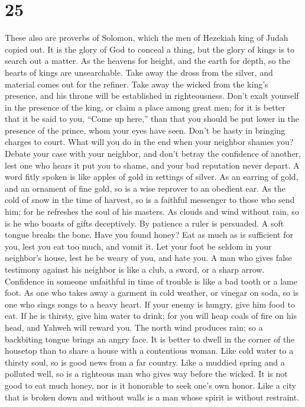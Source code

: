 \hypertarget{section-19}{%
\section{25}\label{section-19}}

 These also are proverbs of Solomon, which the men of
Hezekiah king of Judah copied out.  It is the glory of God
to conceal a thing, but the glory of kings is to search out a matter.
 As the heavens for height, and the earth for depth, so the
hearts of kings are unsearchable.  Take away the dross from
the silver, and material comes out for the refiner.  Take
away the wicked from the king's presence, and his throne will be
established in righteousness.  Don't exalt yourself in the
presence of the king, or claim a place among great men;  for
it is better that it be said to you, ``Come up here,'' than that you
should be put lower in the presence of the prince, whom your eyes have
seen.  Don't be hasty in bringing charges to court. What
will you do in the end when your neighbor shames you? 
Debate your case with your neighbor, and don't betray the confidence of
another,  lest one who hears it put you to shame, and your
bad reputation never depart.  A word fitly spoken is like
apples of gold in settings of silver.  As an earring of
gold, and an ornament of fine gold, so is a wise reprover to an obedient
ear.  As the cold of snow in the time of harvest, so is a
faithful messenger to those who send him; for he refreshes the soul of
his masters.  As clouds and wind without rain, so is he who
boasts of gifts deceptively.  By patience a ruler is
persuaded. A soft tongue breaks the bone.  Have you found
honey? Eat as much as is sufficient for you, lest you eat too much, and
vomit it.  Let your foot be seldom in your neighbor's
house, lest he be weary of you, and hate you.  A man who
gives false testimony against his neighbor is like a club, a sword, or a
sharp arrow.  Confidence in someone unfaithful in time of
trouble is like a bad tooth or a lame foot.  As one who
takes away a garment in cold weather, or vinegar on soda, so is one who
sings songs to a heavy heart.  If your enemy is hungry,
give him food to eat. If he is thirsty, give him water to drink;
 for you will heap coals of fire on his head, and Yahweh
will reward you.  The north wind produces rain; so a
backbiting tongue brings an angry face.  It is better to
dwell in the corner of the housetop than to share a house with a
contentious woman.  Like cold water to a thirsty soul, so
is good news from a far country.  Like a muddied spring and
a polluted well, so is a righteous man who gives way before the wicked.
 It is not good to eat much honey, nor is it honorable to
seek one's own honor.  Like a city that is broken down and
without walls is a man whose spirit is without restraint.

